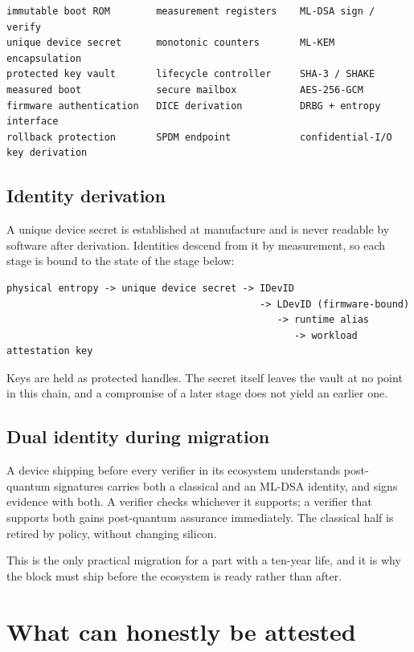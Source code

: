 \documentclass[11pt,a4paper]{article}
\begin{document}
\begin{lstlisting}
immutable boot ROM        measurement registers    ML-DSA sign / verify
unique device secret      monotonic counters       ML-KEM encapsulation
protected key vault       lifecycle controller     SHA-3 / SHAKE
measured boot             secure mailbox           AES-256-GCM
firmware authentication   DICE derivation          DRBG + entropy interface
rollback protection       SPDM endpoint            confidential-I/O key derivation
\end{lstlisting}

\subsection{Identity derivation}

A unique device secret is established at manufacture and is never readable by
software after derivation. Identities descend from it by measurement, so each
stage is bound to the state of the stage below:

\begin{lstlisting}
physical entropy -> unique device secret -> IDevID
                                            -> LDevID (firmware-bound)
                                               -> runtime alias
                                                  -> workload attestation key
\end{lstlisting}

Keys are held as protected handles. The secret itself leaves the vault at no
point in this chain, and a compromise of a later stage does not yield an
earlier one.

\subsection{Dual identity during migration}

A device shipping before every verifier in its ecosystem understands
post-quantum signatures carries both a classical and an ML-DSA identity, and
signs evidence with both. A verifier checks whichever it supports; a verifier
that supports both gains post-quantum assurance immediately. The classical half
is retired by policy, without changing silicon.

This is the only practical migration for a part with a ten-year life, and it is
why the block must ship before the ecosystem is ready rather than after.

\section{What can honestly be attested}
\end{document}
